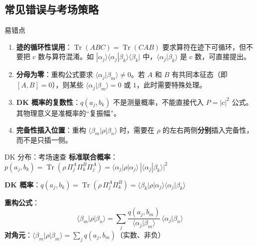 \subsection{常见错误与考场策略}

\begin{errorbox}{易错点}
\begin{enumerate}
  \item \textbf{迹的循环性误用}：$\operatorname{Tr}(ABC)=\operatorname{Tr}(CAB)$ 要求算符在迹下可循环，但不要把 c 数与算符混淆。如 $|\alpha_j\rangle\langle\alpha_j|\beta_k\rangle\langle\beta_k|$ 中，$\langle\alpha_j|\beta_k\rangle$ 是 c 数，可直接提出。
  \item \textbf{分母为零}：重构公式要求 $\langle\alpha_j|\beta_m\rangle\neq 0$。若 $A$ 和 $B$ 有共同本征态（即 $[A,B]=0$），则某些 $\langle\alpha_j|\beta_m\rangle=0$ 或 $1$，此时需要特殊处理。
  \item \textbf{DK 概率的复数性}：$q(a_j,b_k)$ 不是测量概率，不能直接代入 $P=|c|^2$ 公式。其物理意义是准概率的``复振幅''。
  \item \textbf{完备性插入位置}：重构 $\langle\beta_m|\rho|\beta_n\rangle$ 时，需要在 $\rho$ 的左右两侧\textbf{分别}插入完备性，而不是只插一侧。
\end{enumerate}
\end{errorbox}

\begin{cheatbox}{DK 分布：考场速查}
\textbf{标准联合概率}：$p(a_j,b_k)=\operatorname{Tr}(\rho\,\Pi_j^A\Pi_k^B\Pi_j^A)=\langle\alpha_j|\rho|\alpha_j\rangle\,|\langle\alpha_j|\beta_k\rangle|^2$

\textbf{DK 概率}：$q(a_j,b_k)=\operatorname{Tr}(\rho\,\Pi_j^A\Pi_k^B)=\langle\beta_k|\rho|\alpha_j\rangle\langle\alpha_j|\beta_k\rangle$

\textbf{重构公式}：
\[
  \langle\beta_m|\rho|\beta_n\rangle = \sum_j \frac{q(a_j,b_m)}{\langle\alpha_j|\beta_m\rangle}\,\langle\alpha_j|\beta_n\rangle
\]
\textbf{对角元}：$\langle\beta_m|\rho|\beta_m\rangle=\sum_j q(a_j,b_m)$（实数、非负）
\end{cheatbox}
